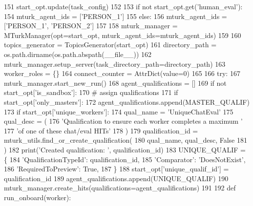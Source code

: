 \begin{DoxyCode}
{{{{151     start\_opt.update(task\_config)
152 
153     \textcolor{keywordflow}{if} \textcolor{keywordflow}{not} start\_opt.get(\textcolor{stringliteral}{'human\_eval'}):
154         mturk\_agent\_ids = [\textcolor{stringliteral}{'PERSON\_1'}]
155     \textcolor{keywordflow}{else}:
156         mturk\_agent\_ids = [\textcolor{stringliteral}{'PERSON\_1'}, \textcolor{stringliteral}{'PERSON\_2'}]
157 
158     mturk\_manager = MTurkManager(opt=start\_opt, mturk\_agent\_ids=mturk\_agent\_ids)
159 
160     topics\_generator = TopicsGenerator(start\_opt)
161     directory\_path = os.path.dirname(os.path.abspath(\_\_file\_\_))
162     mturk\_manager.setup\_server(task\_directory\_path=directory\_path)
163     worker\_roles = \{\}
164     connect\_counter = AttrDict(value=0)
165 
166     \textcolor{keywordflow}{try}:
167         mturk\_manager.start\_new\_run()
168         agent\_qualifications = []
169         \textcolor{keywordflow}{if} \textcolor{keywordflow}{not} start\_opt[\textcolor{stringliteral}{'is\_sandbox'}]:
170             \textcolor{comment}{# assign qualifications}
171             \textcolor{keywordflow}{if} start\_opt[\textcolor{stringliteral}{'only\_masters'}]:
172                 agent\_qualifications.append(MASTER\_QUALIF)
173             \textcolor{keywordflow}{if} start\_opt[\textcolor{stringliteral}{'unique\_workers'}]:
174                 qual\_name = \textcolor{stringliteral}{'UniqueChatEval'}
175                 qual\_desc = (
176                     \textcolor{stringliteral}{'Qualification to ensure each worker completes a maximum '}
177                     \textcolor{stringliteral}{'of one of these chat/eval HITs'}
178                 )
179                 qualification\_id = mturk\_utils.find\_or\_create\_qualification(
180                     qual\_name, qual\_desc, \textcolor{keyword}{False}
181                 )
182                 print(\textcolor{stringliteral}{'Created qualification: '}, qualification\_id)
183                 UNIQUE\_QUALIF = \{
184                     \textcolor{stringliteral}{'QualificationTypeId'}: qualification\_id,
185                     \textcolor{stringliteral}{'Comparator'}: \textcolor{stringliteral}{'DoesNotExist'},
186                     \textcolor{stringliteral}{'RequiredToPreview'}: \textcolor{keyword}{True},
187                 \}
188                 start\_opt[\textcolor{stringliteral}{'unique\_qualif\_id'}] = qualification\_id
189                 agent\_qualifications.append(UNIQUE\_QUALIF)
190         mturk\_manager.create\_hits(qualifications=agent\_qualifications)
191 
192         \textcolor{keyword}{def }run\_onboard(worker):
}}}}
\end{DoxyCode}
